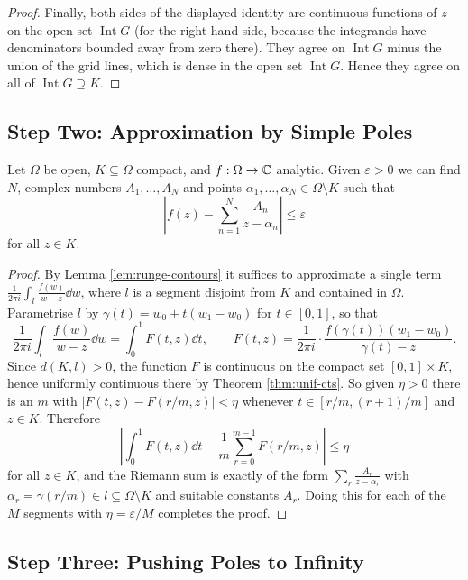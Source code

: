 \documentclass[a4paper]{scrartcl}
\newcommand{\Int}{\operatorname{Int}}
\begin{document}
\begin{proof}
	Finally, both sides of the displayed identity are continuous functions of $z$ on the open set $\Int G$ (for the right-hand side, because the integrands have denominators bounded away from zero there). They agree on $\Int G$ minus the union of the grid lines, which is dense in the open set $\Int G$. Hence they agree on all of $\Int G \supseteq K$.
\end{proof}

\subsection{Step Two: Approximation by Simple Poles}

\begin{lemma}\label{lem:runge-poles}
	Let $\Omega$ be open, $K\subseteq\Omega$ compact, and $f:\Omega\to\mathbb{C}$ analytic. Given $\varepsilon>0$ we can find $N$, complex numbers $A_1,\ldots,A_N$ and points $\alpha_1,\ldots,\alpha_N\in\Omega\setminus K$ such that
	$$\left|f(z)-\sum_{n=1}^N\frac{A_n}{z-\alpha_n}\right|\leq\varepsilon$$
	for all $z\in K$.
\end{lemma}

\begin{proof}
	By Lemma \ref{lem:runge-contours} it suffices to approximate a single term $\frac{1}{2\pi i}\int_l\frac{f(w)}{w-z}\dd w$, where $l$ is a segment disjoint from $K$ and contained in $\Omega$. Parametrise $l$ by $\gamma(t) = w_0+t(w_1-w_0)$ for $t\in[0,1]$, so that
	$$\frac{1}{2\pi i}\int_l\frac{f(w)}{w-z}\dd w = \int_0^1 F(t,z)\dd t, \qquad F(t,z) = \frac{1}{2\pi i}\cdot\frac{f(\gamma(t))(w_1-w_0)}{\gamma(t)-z}.$$
	Since $d(K,l)>0$, the function $F$ is continuous on the compact set $[0,1]\times K$, hence uniformly continuous there by Theorem \ref{thm:unif-cts}. So given $\eta>0$ there is an $m$ with $|F(t,z)-F(r/m,z)|<\eta$ whenever $t\in[r/m,(r+1)/m]$ and $z\in K$. Therefore
	$$\left|\int_0^1F(t,z)\dd t - \frac1m\sum_{r=0}^{m-1}F(r/m,z)\right| \leq \eta$$
	for all $z\in K$, and the Riemann sum is exactly of the form $\sum_r \frac{A_r}{z-\alpha_r}$ with $\alpha_r = \gamma(r/m) \in l\subseteq\Omega\setminus K$ and suitable constants $A_r$. Doing this for each of the $M$ segments with $\eta = \varepsilon/M$ completes the proof.
\end{proof}

\subsection{Step Three: Pushing Poles to Infinity}
\end{document}
